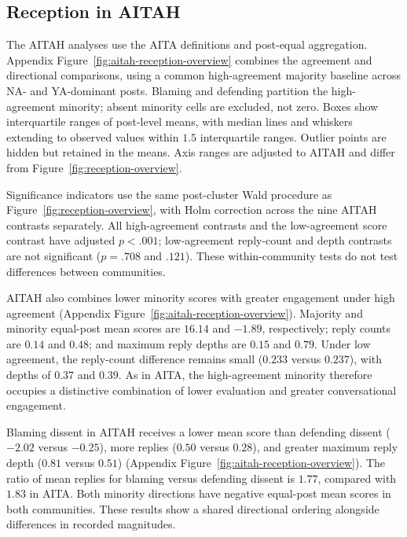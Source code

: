 

\subsection{Reception in AITAH}
\label{sec:supp-aitah-reception}

The AITAH analyses use the AITA definitions and post-equal aggregation.
Appendix Figure~\ref{fig:aitah-reception-overview} combines the agreement
and directional comparisons, using a common high-agreement majority
baseline across NA- and YA-dominant posts. Blaming and defending partition
the high-agreement minority; absent minority cells are excluded, not zero.
Boxes show interquartile ranges of post-level means, with median lines
and whiskers extending to observed values within $1.5$ interquartile ranges.
Outlier points are hidden but retained in the means. Axis ranges are
adjusted to AITAH and differ from Figure~\ref{fig:reception-overview}.

Significance indicators use the same post-cluster Wald procedure as
Figure~\ref{fig:reception-overview}, with Holm correction across the nine
AITAH contrasts separately. All high-agreement contrasts and the
low-agreement score contrast have adjusted $p<.001$; low-agreement
reply-count and depth contrasts are not significant ($p=.708$ and $.121$).
These within-community tests do not test differences between communities.

AITAH also combines lower minority scores with greater engagement under
high agreement (Appendix Figure~\ref{fig:aitah-reception-overview}).
Majority and minority equal-post mean scores are $16.14$ and $-1.89$,
respectively; reply counts are $0.14$ and $0.48$; and maximum reply
depths are $0.15$ and $0.79$. Under low agreement, the reply-count difference
remains small ($0.233$ versus $0.237$), with depths of $0.37$ and $0.39$.
As in AITA, the high-agreement minority therefore occupies a distinctive
combination of lower evaluation and greater conversational engagement.

Blaming dissent in AITAH receives a lower mean score than defending dissent
($-2.02$ versus $-0.25$), more replies ($0.50$ versus $0.28$), and
greater maximum reply depth ($0.81$ versus $0.51$)
(Appendix Figure~\ref{fig:aitah-reception-overview}).
The ratio of mean replies for blaming versus defending dissent is
$1.77$, compared with $1.83$ in
AITA. Both minority directions have negative equal-post mean scores in
both communities. These results show a shared
directional ordering alongside differences in recorded magnitudes.

